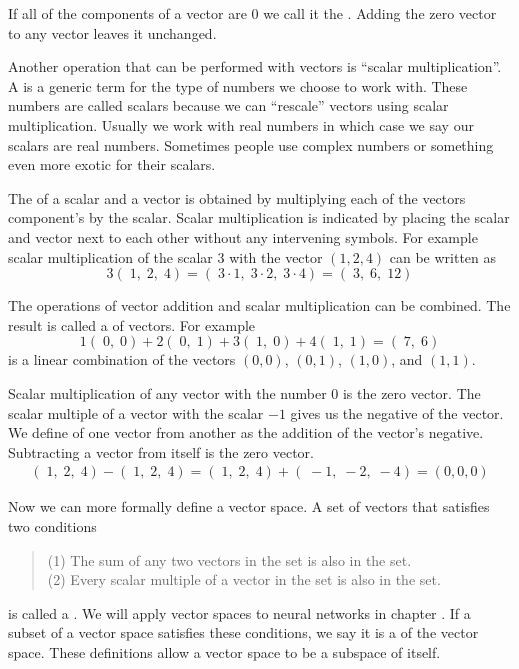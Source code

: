 If all of the components of a vector are $0$ we call it the . Adding the zero vector to any vector leaves it unchanged.

  Another operation that can be performed with vectors is ``scalar 
multiplication''. A  is a generic term for the type of
numbers we choose to work with. These numbers are called scalars because we 
can ``rescale'' vectors using scalar multiplication. Usually we work with real 
numbers in which case we say our scalars are real numbers. Sometimes people 
use complex numbers or something even more exotic for their scalars. 

  The  of a scalar and a vector is obtained by 
multiplying each of the vectors component's by the scalar. Scalar 
multiplication is indicated by placing the scalar and vector next to each other 
without any intervening symbols. For example scalar multiplication of the 
scalar $3$ with the vector $( 1, 2, 4)$ can be written as
\begin{equation*}
3(\; 1, \; 2, \; 4) = (\; 3 \cdot 1, \; 3 \cdot 2, \; 3 \cdot 4) 
= (\; 3,\; 6, \; 12)
\end{equation*}

   The operations of vector addition and scalar multiplication can be combined.
The result is called a  of vectors. For example
\begin{equation*}
  1 (\; 0,\; 0) + 2 (\; 0,\; 1) + 3 (\; 1,\; 0) + 4 (\; 1,\; 1) =  (\; 7,\; 6)
\end{equation*}
is a linear combination of the vectors $(0,0)$, $(0,1)$, $(1,0)$, and $(1,1)$.

   Scalar multiplication of any vector with the number $0$ is the zero vector.
The scalar multiple of a vector with the scalar $-1$ gives us the negative
of the vector. We define  of one vector from 
another as the addition of the vector's negative. Subtracting a vector from 
itself is the zero vector.
\begin{eqnarray*}
  (\; 1, \; 2, \; 4) - (\; 1, \; 2, \; 4) = 
  (\; 1, \; 2, \; 4) + (\; -1, \; -2, \; -4) = (0,0,0)
\end{eqnarray*}

 Now we can more formally define a vector space. A set of vectors that satisfies two conditions
\begin{quote}
(1) The sum of any two vectors in the set is also in the set.\\
(2) Every scalar multiple of a vector in the set is also in the set. 
\end{quote}
is called a . We will apply vector spaces to neural 
networks in chapter . If a subset of a vector space satisfies these 
conditions, we say it is a  of the vector space. These 
definitions allow a vector space to be a subspace of itself. 

